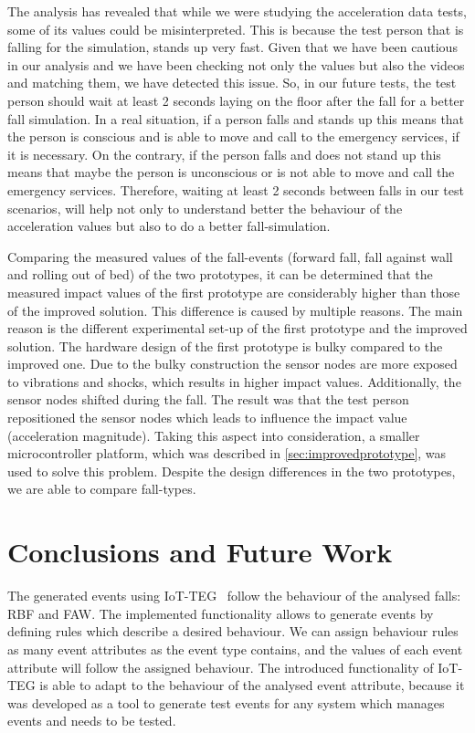 \documentclass[review]{elsarticle}
\begin{document}
The analysis has revealed that while we were studying the acceleration data tests, some of its values could be misinterpreted.
This is because the test person that is falling for the simulation, stands up very fast. Given that we have been cautious
in our analysis and we have been checking not only the values but also the videos and matching them, we have detected
this issue. So, in our future tests, the test person should wait at least 2 seconds laying on the floor 
after the fall for a better fall simulation. In a real situation, if a
person falls and stands up this means that the person
is conscious and is able to move and call to the emergency services, if it is necessary. On the contrary, if the person
falls and does not stand up this means that maybe the person is unconscious or is not able to move and call the emergency
services. Therefore, waiting at least 2 seconds between falls in our test scenarios, will help not only to understand 
better the behaviour of the acceleration values but also to do a better fall-simulation.

Comparing the measured values of the fall-events (forward fall, fall against wall and rolling out of bed) of the two 
prototypes, it can be determined that the measured impact values of the first prototype are considerably higher than 
those of the improved solution. This difference is caused by multiple reasons. The main reason is the different 
experimental set-up of the first prototype and the improved solution. The hardware design of the first prototype is 
bulky compared to the improved one. Due to the bulky construction the sensor nodes are more exposed to vibrations and 
shocks, which results in higher impact values. Additionally, the sensor nodes shifted during the fall. The result was 
that the test person repositioned the sensor nodes which leads to influence the impact value (acceleration magnitude). 
Taking this aspect into consideration, a smaller microcontroller
platform, which was described in \ref{sec:improvedprototype}, was used
to solve this problem. Despite the design differences in the two
prototypes,  
we are able to compare fall-types.

\section{Conclusions and Future Work}
\label{sec:conclusions}

The generated events using IoT-TEG~\cite{TesisGutierrez2017,Gutierrez2017} follow the behaviour of the analysed falls: 
RBF and FAW. The implemented functionality 
allows to generate events by defining rules which describe a desired behaviour. We can assign behaviour rules as many 
event attributes as the event type contains, and the values of each event attribute will follow the assigned behaviour.
The introduced functionality of IoT-TEG is able to adapt to the behaviour of the analysed event attribute, because
it was developed as a tool to generate test events for any system
which manages events and needs to be tested.
\end{document}
